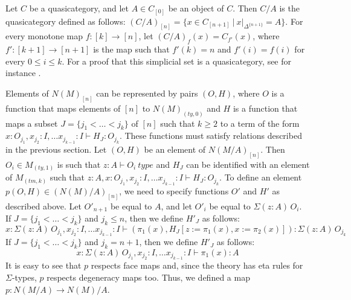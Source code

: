 \documentclass[reqno]{amsart}
\theoremstyle{definition}
\theoremstyle{remark}
\newcommand{\repl}{:=}
\numberwithin{figure}{section}
\begin{document}
Let $C$ be a quasicategory, and let $A \in C_{[0]}$ be an object of $C$.
Then $C/A$ is the quasicategory defined as follows: $(C/A)_{[n]} = \{ x \in C_{[n+1]}\ |\ x|_{\Delta^{\{n+1\}}} = A \}$.
For every monotone map $f : [k] \to [n]$, let $(C/A)_f(x) = C_{f'}(x)$, where $f' : [k+1] \to [n+1]$ is the map such that $f'(k) = n$ and $f'(i) = f(i)$ for every $0 \leq i \leq k$.
For a proof that this simplicial set is a quasicategory, see for instance \cite[Proposition~1.2.9.3]{lurie-topos}.

Elements of $N(M)_{[n]}$ can be represented by pairs $(O,H)$, where $O$ is a function that maps elements of $[n]$ to $N(M)_{(ty,0)}$
and $H$ is a function that maps a subset $J = \{ j_1 < \ldots < j_k \}$ of $[n]$ such that $k \geq 2$ to a term of the form $x : O_{j_1}, x_{j_2} : I, \ldots x_{j_{k-1}} : I \vdash H_J : O_{j_k}$.
These functions must satisfy relations described in the previous section.
Let $(O,H)$ be an element of $N(M/A)_{[n]}$.
Then $O_i \in M_{(ty,1)}$ is such that $z : A \vdash O_i\ type$ and $H_J$ can be identified with an element of $M_{(tm,k)}$ such that $z : A, x : O_{j_1}, x_{j_2} : I, \ldots x_{j_{k-1}} : I \vdash H_J : O_{j_k}$.
To define an element $p(O,H) \in (N(M)/A)_{[n]}$, we need to specify functions $O'$ and $H'$ as described above.
Let $O'_{n+1}$ be equal to $A$, and let $O'_i$ be equal to $\Sigma(z : A)\,O_i$.
If $J = \{ j_1 < \ldots < j_k \}$ and $j_k \leq n$, then we define $H'_J$ as follows:
\[ x : \Sigma (z : A)\,O_{j_1}, x_{j_2} : I, \ldots x_{j_{k-1}} : I \vdash (\pi_1(x), H_J[z \repl \pi_1(x), x \repl \pi_2(x)]) : \Sigma (z : A)\,O_{j_k} \]
If $J = \{ j_1 < \ldots < j_k \}$ and $j_k = n+1$, then we define $H'_J$ as follows:
\[ x : \Sigma (z : A)\,O_{j_1}, x_{j_2} : I, \ldots x_{j_{k-1}} : I \vdash \pi_1(x) : A \]
It is easy to see that $p$ respects face maps and, since the theory has eta rules for $\Sigma$-types, $p$ respects degeneracy maps too.
Thus, we defined a map $p : N(M/A) \to N(M)/A$.
\end{document}
